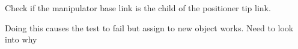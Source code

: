 \begin{DoxyRefList}
%
Check if the manipulator base link is the child of the positioner tip link.  
\item[Member \mbox{\hyperlink{tesseract__scene__graph__unit_8cpp_a07e5d7fb0413d0780df4b637bcd35845}{TEST}} (Tesseract\+Scene\+Graph\+Unit, Tesseract\+Scene\+Graph\+Remove\+Link\+Unit)]\label{todo__todo000007}%
%
Doing this causes the test to fail but assign to new object works. Need to look into why 
\end{DoxyRefList}